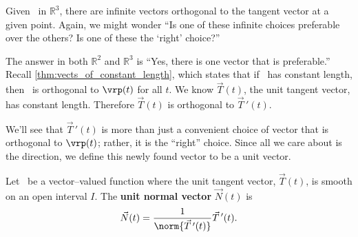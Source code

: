 
Given \vrt\ in $\mathbb{R}^3$,  there are infinite vectors orthogonal to the tangent vector at a given point. Again, we might wonder ``Is one of these infinite choices preferable over the others? Is one of these the `right' choice?''

The answer in both $\mathbb{R}^2$ and $\mathbb{R}^3$ is ``Yes, there is one vector that is preferable.'' %
Recall \autoref{thm:vects_of_constant_length}, which states that if \vrt\ has constant length, then \vrt\ is orthogonal to $\vrp(t)$ for all $t$. We know $\vec T(t)$, the unit tangent vector, has constant length. Therefore $\vec T(t)$ is orthogonal to $\vec T\,'(t)$.

We'll see that $\vec T\,'(t)$ is more than just a convenient choice of vector that is orthogonal to $\vrp(t)$; rather, it is the ``right'' choice. Since all we care about is the direction, we define this newly found vector to be a unit vector.

{Let \vrt\ be a vector--valued function where the unit tangent vector, $\vec T(t)$, is smooth on an open interval $I$. The \textbf{unit normal vector} $\vec N(t)$ is
\[\vec N(t) = \frac1{\norm{\vec T\,'(t)}}\vec T\,'(t).\]}

